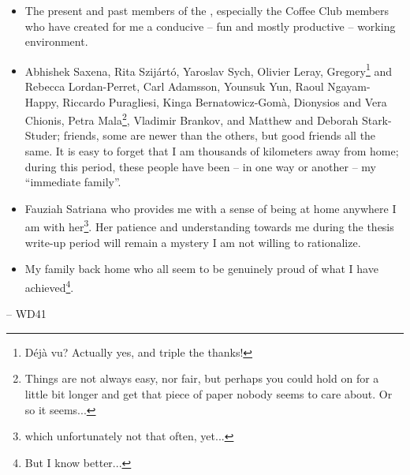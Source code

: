 \begin{itemize}
	\item The present and past members of the , especially the  Coffee Club members who have created for me a conducive -- fun and mostly productive -- working environment.
	
	\item Abhishek Saxena, Rita Szijártó, Yaroslav Sych, Olivier Leray, Gregory\footnote{Déjà vu? Actually yes, and triple the thanks!} and Rebecca Lordan-Perret, Carl Adamsson, Younsuk Yun, Raoul Ngayam-Happy, Riccardo Puragliesi, Kinga Bernatowicz-Gom\`a, Dionysios and Vera Chionis, Petra Mala\footnote{Things are not always easy, nor fair, but perhaps you could hold on for a little bit longer and get that piece of paper nobody seems to care about. Or so it seems...}, Vladimir Brankov, and Matthew and Deborah Stark-Studer; friends, some are newer than the others, but good friends all the same.
  It is easy to forget that I am thousands of kilometers away from home; during this period, these people have been -- in one way or another -- my ``immediate family''.
  
  \item Fauziah Satriana who provides me with a sense of being at home anywhere I am with her\footnote{which unfortunately not that often, yet...}.
    Her patience and understanding towards me during the thesis write-up period will remain a mystery I am not willing to rationalize.
  
  \item My family back home who all seem to be genuinely proud of what I have achieved\footnote{But I know better...}.
\end{itemize}

\bigskip
\hspace*{0mm}-- WD41
